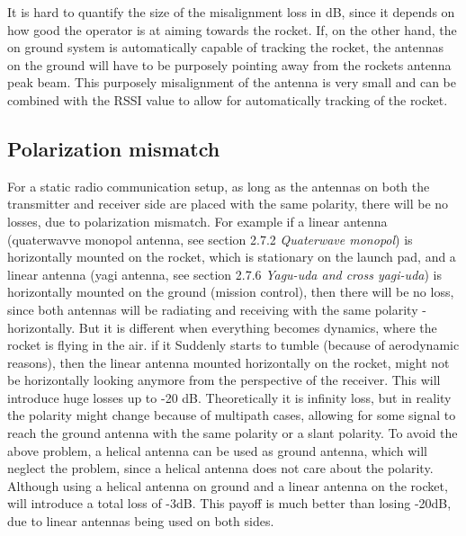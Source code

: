 It is hard to  quantify the size of the misalignment loss in dB, since it depends on how good the operator is at aiming towards the rocket. If, on the other hand, the on ground system is automatically capable of tracking the rocket, the antennas on the ground will have to be purposely pointing away from the rockets antenna peak beam. This purposely misalignment of the antenna is very small and can be combined with the RSSI value to allow for automatically tracking of the rocket. %

\subsection{Polarization mismatch}
For a static radio communication setup, as long as the antennas on both the transmitter and receiver side are placed with the same polarity, there will be no losses, due to polarization mismatch. For example if a linear antenna (quaterwavve monopol antenna, see section 2.7.2 \textit{Quaterwave monopol}) is horizontally mounted on the rocket, which is stationary on the launch pad, and a linear antenna (yagi antenna, see section 2.7.6 \textit{Yagu-uda and cross yagi-uda}) is horizontally mounted on the ground (mission control), then there will be no loss, since both antennas will be radiating and receiving with the same polarity - horizontally. But it is different when everything becomes dynamics, where the rocket is flying in the air. if it Suddenly starts to tumble (because of aerodynamic reasons), then the linear antenna mounted horizontally on the rocket, might not be horizontally looking anymore from the perspective of the receiver. This will introduce huge losses up to -20 dB. Theoretically it is infinity loss, but in reality the polarity might change because of multipath cases, allowing for some signal to reach the ground antenna with the same polarity or a slant polarity. To avoid the above problem, a helical antenna can be used as ground antenna, which will neglect the problem, since a helical antenna does not care about the polarity. Although using a helical antenna on ground and a linear antenna on the rocket, will introduce a total loss of -3dB. This payoff is much better than losing -20dB, due to linear antennas being used on both sides.   


